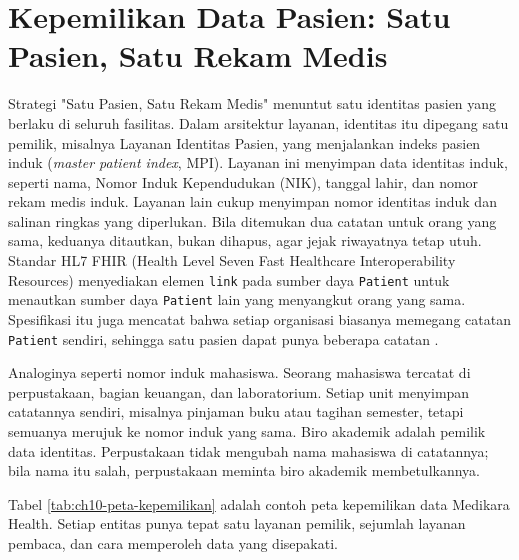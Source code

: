 \section{Kepemilikan Data Pasien: Satu Pasien, Satu Rekam Medis}
\label{sec:ch10-data-pasien}

Strategi "Satu Pasien, Satu Rekam Medis" menuntut satu identitas pasien yang berlaku di seluruh
fasilitas. Dalam arsitektur layanan, identitas itu dipegang satu pemilik, misalnya Layanan
Identitas Pasien, yang menjalankan indeks pasien induk (\textit{master patient index}, MPI).
Layanan ini menyimpan data identitas induk, seperti nama, Nomor Induk Kependudukan (NIK), tanggal
lahir, dan nomor rekam medis induk. Layanan lain cukup menyimpan nomor identitas induk dan salinan
ringkas yang diperlukan. Bila ditemukan dua catatan untuk orang yang sama, keduanya ditautkan,
bukan dihapus, agar jejak riwayatnya tetap utuh. Standar HL7 FHIR (Health Level Seven Fast
Healthcare Interoperability Resources) menyediakan elemen \texttt{link} pada sumber daya
\texttt{Patient} untuk menautkan sumber daya \texttt{Patient} lain yang menyangkut orang yang sama.
Spesifikasi itu juga mencatat bahwa setiap organisasi biasanya memegang catatan \texttt{Patient}
sendiri, sehingga satu pasien dapat punya beberapa catatan \cite{fhir-r4-patient}.

Analoginya seperti nomor induk mahasiswa. Seorang mahasiswa tercatat di perpustakaan, bagian
keuangan, dan laboratorium. Setiap unit menyimpan catatannya sendiri, misalnya pinjaman buku atau
tagihan semester, tetapi semuanya merujuk ke nomor induk yang sama. Biro akademik adalah pemilik
data identitas. Perpustakaan tidak mengubah nama mahasiswa di catatannya; bila nama itu salah,
perpustakaan meminta biro akademik membetulkannya.

Tabel \ref{tab:ch10-peta-kepemilikan} adalah contoh peta kepemilikan data Medikara Health. Setiap
entitas punya tepat satu layanan pemilik, sejumlah layanan pembaca, dan cara memperoleh data yang
disepakati.


